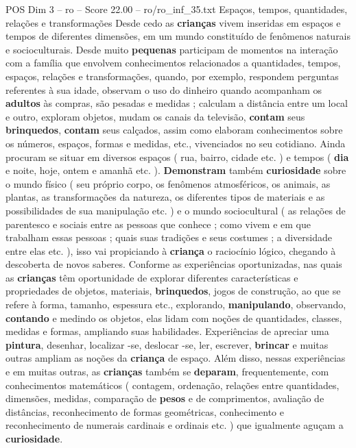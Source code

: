 \begin{textsample}{POS Dim 3 – ro – Score 22.00 – ro/ro\_inf\_35.txt}  \label{ex:f3_pos_139}
Espaços, tempos, quantidades, relações e transformações Desde cedo as \textbf{crianças} vivem inseridas em espaços e tempos de diferentes dimensões, em um mundo constituído de fenômenos naturais e socioculturais.
Desde muito \textbf{pequenas} participam de momentos na interação com a família que envolvem conhecimentos relacionados a quantidades, tempos, espaços, relações e transformações, quando, por exemplo, respondem perguntas referentes à sua idade, observam o uso do dinheiro quando acompanham os \textbf{adultos} às compras, são pesadas e medidas ; calculam a distância entre um local e outro, exploram objetos, mudam os canais da televisão, \textbf{contam} seus \textbf{brinquedos}, \textbf{contam} seus calçados, assim como elaboram conhecimentos sobre os números, espaços, formas e medidas, etc., vivenciados no seu cotidiano.
Ainda procuram se situar em diversos espaços ( rua, bairro, cidade etc. ) e tempos ( \textbf{dia} e noite, hoje, ontem e amanhã etc. ). \textbf{Demonstram} também \textbf{curiosidade} sobre o mundo físico ( seu próprio corpo, os fenômenos atmosféricos, os animais, as plantas, as transformações da natureza, os diferentes tipos de materiais e as possibilidades de sua manipulação etc. ) e o mundo sociocultural ( as relações de parentesco e sociais entre as pessoas que conhece ; como vivem e em que trabalham essas pessoas ; quais suas tradições e seus costumes ; a diversidade entre elas etc. ), isso vai propiciando à \textbf{criança} o raciocínio lógico, chegando à descoberta de novos saberes.
Conforme as experiências oportunizadas, nas quais as \textbf{crianças} têm oportunidade de explorar diferentes características e propriedades de objetos, materiais, \textbf{brinquedos}, jogos de construção, ao que se refere à forma, tamanho, espessura etc., explorando, \textbf{manipulando}, observando, \textbf{contando} e medindo os objetos, elas lidam com noções de quantidades, classes, medidas e formas, ampliando suas habilidades.
Experiências de apreciar uma \textbf{pintura}, desenhar, localizar -se, deslocar -se, ler, escrever, \textbf{brincar} e muitas outras ampliam as noções da \textbf{criança} de espaço.
Além disso, nessas experiências e em muitas outras, as \textbf{crianças} também se \textbf{deparam}, frequentemente, com conhecimentos matemáticos ( contagem, ordenação, relações entre quantidades, dimensões, medidas, comparação de \textbf{pesos} e de comprimentos, avaliação de distâncias, reconhecimento de formas geométricas, conhecimento e reconhecimento de numerais cardinais e ordinais etc. ) que igualmente aguçam a \textbf{curiosidade}.

\end{textsample}
